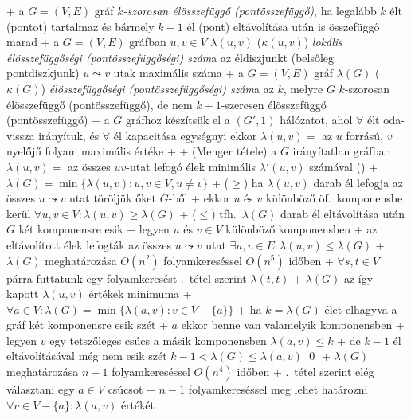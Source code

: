 + \dfn a $G = (V, E)$ gráf \emph{$k$-szorosan élösszefüggő
  (pontösszefüggő)}, ha legalább $k$ élt (pontot) tartalmaz és bármely
  $k - 1$ él (pont) eltávolítása után is összefüggő marad
+ \dfn a $G = (V, E)$ gráfban $u, v \in V$ $\lambda(u, v)$ ($\kappa(u,
  v)$) \emph{lokális élösszefüggőségi (pontösszefüggőségi) szám}a az
  éldiszjunkt (belsőleg pontdiszkjunk) $u \leadsto v$
  utak maximális száma
+ \dfn a $G = (V, E)$ gráf $\lambda(G)$ ($\kappa(G)$)
  \emph{élösszefüggőségi (pontösszefüggőségi)
  szám}a az $k$, melyre $G$ $k$-szorosan élösszefüggő
  (pontösszefüggő), de nem $k + 1$-szeresen élösszefüggő
  (pontösszefüggő)
+ \thm \label{thm:halozat:menger:folyam}a $G$ gráfhoz készítsük el a
  $(G', 1)$ hálózatot, ahol $\forall$ élt
  oda-vissza irányítuk, és $\forall$ él kapacitása egységnyi \RA ekkor
  $\lambda(u, v) =$ az $u$ forrású, $v$ nyelőjű folyam maximális
  értéke
  + \noproof
+ \thm (Menger tétele) a $G$ irányítatlan gráfban $\lambda(u, v) =$ az
  összes $uv$-utat lefogó élek minimális $\lambda'(u, v)$ számával
  (\noproof)
+ \thm $\lambda(G) = \min \{ \lambda(u, v) : u, v \in V, u \ne v \}$
  + \proof ($\ge$) ha $\lambda(u, v)$ darab él lefogja az összes $u
  \leadsto v$ utat \RA töröljük őket $G$-ből
    + ekkor $u$ és $v$ különböző öf.~komponensbe
      kerül \RA $\forall u, v \in V : \lambda(u, v) \ge \lambda(G)$
  + ($\le$) tfh.~$\lambda(G)$ darab él eltávolítása után $G$ két
    komponensre esik
    + legyen $u$ és $v \in V$ különböző komponensben
    + az eltávolított élek lefogták az összes $u \leadsto v$ utat \RA%
      $\exists u, v \in E : \lambda(u, v) \le \lambda(G)$
+ \alg $\lambda(G)$ meghatározása $O(n^2)$ folyamkereséssel $O(n^5)$
  időben
  + $\forall s, t \in V$ párra futtatunk egy folyamkeresést
    .~tétel szerint \RA $\lambda(t,
    t)$
  + $\lambda(G)$ az így kapott $\lambda(u, v)$ értékek minimuma
+ \thm \label{thm:halozat:menger:linearis}$\forall a \in V :
\lambda(G) = \min \{ \lambda(a, v) : v \in V - \{a\}\}$
  + \proof ha $k = \lambda(G)$ élet elhagyva a gráf két komponensre esik szét
    + $a$ ekkor benne van valamelyik komponensben
    + legyen $v$ egy tetszőleges csúcs a másik komponensben \RA
      $\lambda(a, v) \le k$
    + de $k - 1$ él eltávolításával még nem esik szét \RA $k -
    1 < \lambda(G) \le \lambda(a, v)$ \qed
+ \alg $\lambda(G)$ meghatározása $n - 1$ folyamkereséssel $O(n^4)$
  időben
  + .~tétel szerint elég választani
    egy $a \in V$ csúcsot
  + $n - 1$ folyamkereséssel meg lehet határozni $\forall v \in V - \{a\} :
    \lambda(a, v)$ értékét

